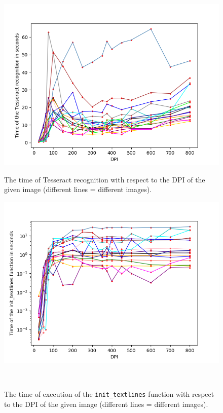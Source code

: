\begin{figure}[t]
    \centering
    \includegraphics[width=\linewidth]{img/results/dpiTimeTesseract.png}
    \caption{The time of Tesseract recognition with respect to the DPI of the given image (different lines = different images).}
    \label{fig:dpiTessTime}
\endminipage\hfill
{}
    \includegraphics[width=\linewidth]{img/results/dpiTimeInit.png}
    \caption{The time of execution of the \texttt{init\_textlines} function with respect to the DPI of the given image (different lines = different images).}
    \label{fig:dpiInitTime}
\endminipage\\
\minipage{\textwidth}

\end{figure}
